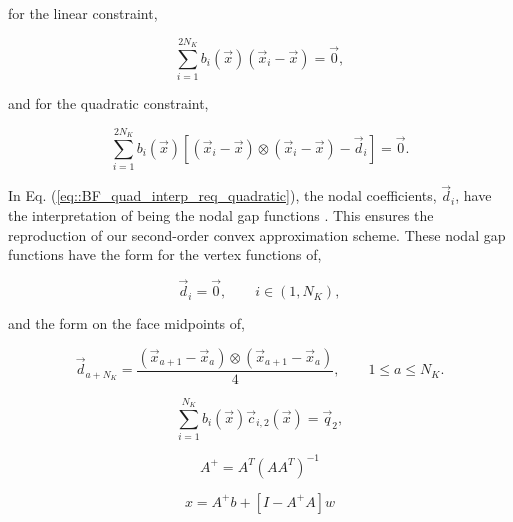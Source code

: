 \noindent for the linear constraint,

\begin{equation}
\sum_{i=1}^{2 N_K}  b_i (\vec{x}) \left( \vec{x}_i -\vec{x}  \right)= \vec{0} ,
\label{eq::BF_quad_interp_req_linear}
\end{equation}

\noindent and for the quadratic constraint,

\begin{equation}
\sum_{i=1}^{2 N_K}  b_i (\vec{x}) \left[  \left( \vec{x}_i -\vec{x}  \right) \otimes \left( \vec{x}_i -\vec{x}  \right) - \vec{d}_i   \right] =  \vec{0} .
\label{eq::BF_quad_interp_req_quadratic}
\end{equation}

\noindent In Eq. (\ref{eq::BF_quad_interp_req_quadratic}), the nodal coefficients, $\vec{d}_i$, have the interpretation of being the nodal gap functions \cite{rosolen2013second}. This ensures the reproduction of our second-order convex approximation scheme. These nodal gap functions have the form for the vertex functions of,

\begin{equation}
\vec{d}_i = \vec{0}, \qquad i \in (1,N_K) ,
\label{eq::BF_quad_nodal gaps_verts}
\end{equation}

\noindent and the form on the face midpoints of,

\begin{equation}
\vec{d}_{a+N_K} = \frac{ \left( \vec{x}_{a+1} -\vec{x}_a  \right) \otimes \left( \vec{x}_{a+1} -\vec{x}_a   \right) }{4}, \qquad   1 \leq a \leq N_K.
\label{eq::BF_quad_nodal gaps_edges}
\end{equation}

\begin{equation}
\sum_{i=1}^{N_K}  b_i (\vec{x}) \vec{c}_{i,2}(\vec{x}) = \vec{q}_2 ,
\label{eq::BF_quad_interp_req_vector}
\end{equation}



\begin{equation}
\label{eq::BF_2DQuadratic_MP_inv}
A^+ = A^{T} \left(   A A^T \right)^{-1}
\end{equation}

\begin{equation}
\label{eq::BF_2DQuadratic_underdetermined_lin_sol}
x = A^+ b + \left[ I - A^+ A  \right] w
\end{equation}

